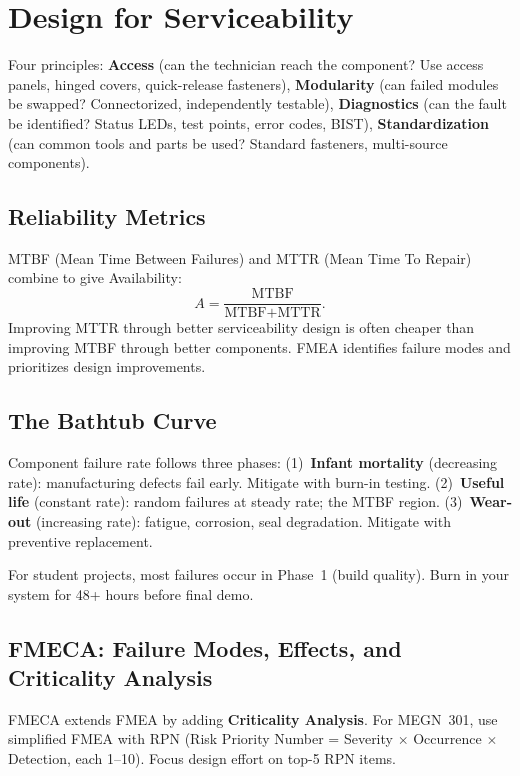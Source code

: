 \section{Design for Serviceability}
Four principles: \textbf{Access} (can the technician reach the component? Use access panels, hinged covers, quick-release fasteners), \textbf{Modularity} (can failed modules be swapped? Connectorized, independently testable), \textbf{Diagnostics} (can the fault be identified? Status LEDs, test points, error codes, BIST), \textbf{Standardization} (can common tools and parts be used? Standard fasteners, multi-source components).

\subsection{Reliability Metrics}
MTBF (Mean Time Between Failures) and MTTR (Mean Time To Repair) combine to give Availability:
\[
A = \frac{\text{MTBF}}{\text{MTBF} + \text{MTTR}}.
\]
Improving MTTR through better serviceability design is often cheaper than improving MTBF through better components. FMEA identifies failure modes and prioritizes design improvements.


\subsection{The Bathtub Curve}
Component failure rate follows three phases: (1)~\textbf{Infant mortality} (decreasing rate): manufacturing defects fail early. Mitigate with burn-in testing. (2)~\textbf{Useful life} (constant rate): random failures at steady rate; the MTBF region. (3)~\textbf{Wear-out} (increasing rate): fatigue, corrosion, seal degradation. Mitigate with preventive replacement.

For student projects, most failures occur in Phase~1 (build quality). Burn in your system for 48+ hours before final demo.

\subsection{FMECA: Failure Modes, Effects, and Criticality Analysis}
FMECA extends FMEA by adding \textbf{Criticality Analysis}. For MEGN~301, use simplified FMEA with RPN (Risk Priority Number = Severity $\times$ Occurrence $\times$ Detection, each 1--10). Focus design effort on top-5 RPN items.

